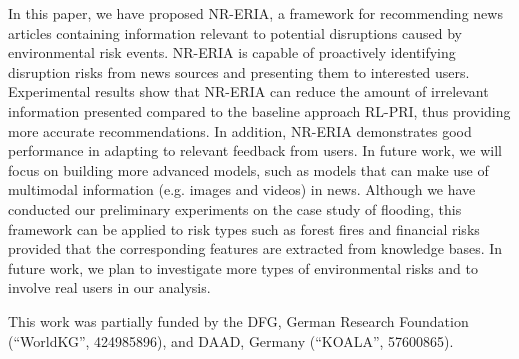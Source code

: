 \documentclass[]{ceurart}
\begin{document}
In this paper, we have proposed NR-ERIA, a framework for recommending news articles containing information relevant to potential disruptions caused by environmental risk events. NR-ERIA is capable of proactively identifying disruption risks from news sources and presenting them to interested users. Experimental results show that NR-ERIA can reduce the amount of irrelevant information presented compared to the baseline approach RL-PRI, thus providing more accurate recommendations. In addition, NR-ERIA demonstrates good performance in adapting to relevant feedback from users. In future work, we will focus on building more advanced models, such as models that can make use of multimodal information (e.g. images and videos) in news. Although we have conducted our preliminary experiments on the case study of flooding, this framework can be applied to risk types such as forest fires and financial risks provided that the corresponding features are extracted from knowledge bases. In future work, we plan to investigate more types of environmental risks and to involve real users in our analysis.


\begin{acknowledgments}

This work was partially funded by the DFG, German Research Foundation (``WorldKG'', 424985896), and DAAD, Germany (``KOALA'', 57600865).

\end{acknowledgments}

 
\end{document}
